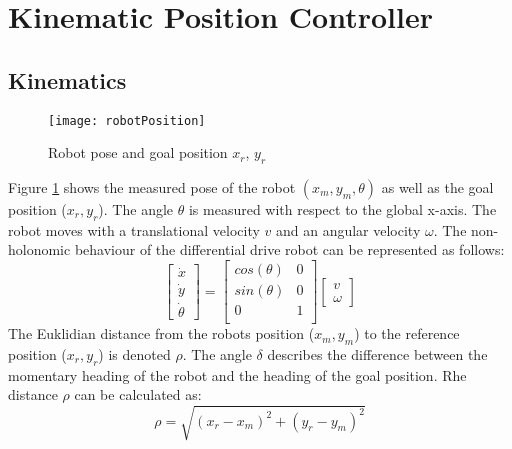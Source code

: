 \documentclass[a4paper, 11pt]{article}
\begin{document}

\newpage
\section{Kinematic Position Controller}
\subsection{Kinematics}
\begin{figure}[H]
	\centering
	\texttt{[image: robotPosition]}
	\caption{Robot pose and goal position $x_r$, $y_r$}	
	\label{fig:robotPosition}	
\end{figure}
\noindent
Figure \ref{fig:robotPosition} shows the measured pose of the robot $(x_m, y_m, \theta)$ as well as the goal position ($x_r,y_r$). The angle $\theta$ is measured with respect to the global x-axis. The robot moves with a translational velocity $v$ and an angular velocity $\omega$. The non-holonomic behaviour of the differential drive robot can be represented as follows:
\begin{equation}
\begin{bmatrix}
\dot{x}\\
\dot{y}\\
\dot{\theta}
\end{bmatrix}
=
\begin{bmatrix}
cos(\theta)	&0\\
sin(\theta)	&0\\
0			&1\\
\end{bmatrix}
\begin{bmatrix}
v\\
\omega
\end{bmatrix}
\end{equation}
The Euklidian distance from the robots position ($x_m, y_m$) to the reference position ($x_r, y_r$) is denoted $\rho$. The angle $\delta$ describes the difference between the momentary heading of the robot and the heading of the goal position. 
Rhe distance $\rho$ can be calculated as:
\begin{equation}
	\rho = \sqrt{(x_r-x_m)^2 + (y_r-y_m)^2}
\end{equation}
\end{document}
